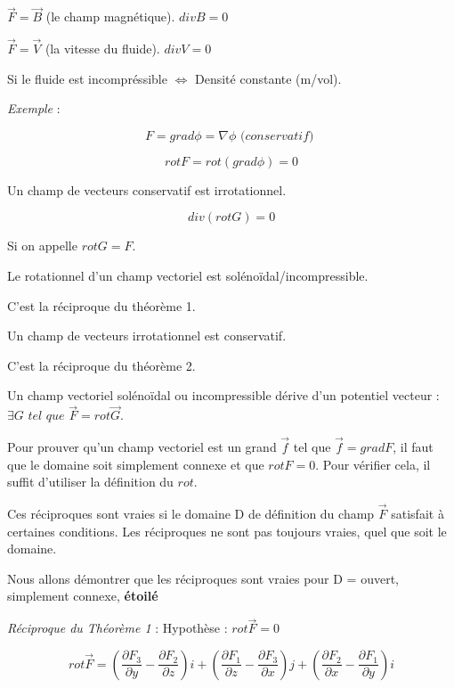  $\vec F= \vec B$ (le champ magnétique). $div B = 0$

 $\vec F= \vec V$ (la vitesse du fluide). $div V = 0$

 Si le fluide est incompréssible $\Leftrightarrow$ Densité constante (m/vol).
 
 \textit{ Exemple} :

 \[F= grad \phi = \nabla \phi \textit{ (conservatif) }\]

 \[rot F = rot ( grad \phi ) =0\]

 \begin{mytheo}
 Un champ de vecteurs conservatif est irrotationnel.
 \end{mytheo}

 \[div ( rot G ) = 0\]

 Si on appelle $rot G = F$.

 \begin{mytheo}
 Le rotationnel d'un champ vectoriel est solénoïdal/incompressible.
 \end{mytheo}


 \begin{mytheo}
 C'est la réciproque du théorème 1.


 Un champ de vecteurs irrotationnel est conservatif.
 \end{mytheo}


 \begin{mytheo}
C'est la réciproque du théorème 2.

 Un champ vectoriel solénoïdal ou incompressible dérive d'un potentiel vecteur : $\exists G \textit{ tel que } \vec F = rot \vec G$.
 \end{mytheo}
 \begin{myrem}

Pour prouver qu'un champ vectoriel est un grand $\vec f $ tel que $\vec f = grad F$, il faut que le domaine soit simplement connexe et que $rot F=0$. Pour vérifier cela, il suffit d'utiliser la définition du $rot$.

 \end{myrem}
 Ces réciproques sont vraies si le domaine D de définition du champ $\vec F$ satisfait à certaines conditions. Les réciproques ne sont pas toujours vraies, quel que soit le domaine.

 Nous allons démontrer que les réciproques sont vraies pour D = ouvert, simplement connexe, \textbf{étoilé}


 \textit{Réciproque du Théorème 1} : Hypothèse : $rot \vec F =0$

 \[rot \vec F
=\left( \frac{\partial F_3}{\partial y } -  \frac{\partial F_2}{\partial z }\right) i
+\left( \frac{\partial F_1}{\partial z } -  \frac{\partial F_3}{\partial x }\right) j
+\left( \frac{\partial F_2}{\partial x } -  \frac{\partial F_1}{\partial y }\right) i
\]

